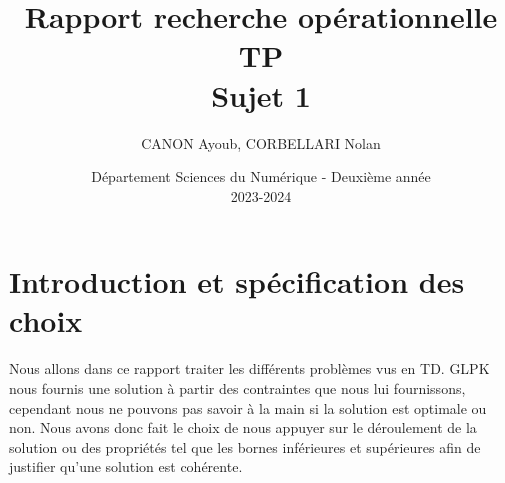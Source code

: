 \documentclass[12pt]{article}
\begin{document}
\title{\vspace{4cm} \textbf{Rapport recherche opérationnelle TP \\ Sujet 1}}
\author{CANON Ayoub, CORBELLARI Nolan}
\date{\vspace{7cm} Département Sciences du Numérique - Deuxième année \\
2023-2024}

\maketitle

\newpage
\pagebreak
\vfill

\newpage
\tableofcontents
\newpage

\section{Introduction et spécification des choix}
Nous allons dans ce rapport traiter les différents problèmes vus en TD. GLPK nous fournis une solution à partir des contraintes que nous lui fournissons,
cependant nous ne pouvons pas savoir à la main si la solution est optimale ou non.
Nous avons donc fait le choix de nous appuyer sur le déroulement de la solution ou des propriétés tel que les bornes inférieures et supérieures afin de justifier qu'une solution est cohérente.

 \newpage
 \newpage
 \newpage
 \newpage
\end{document}
